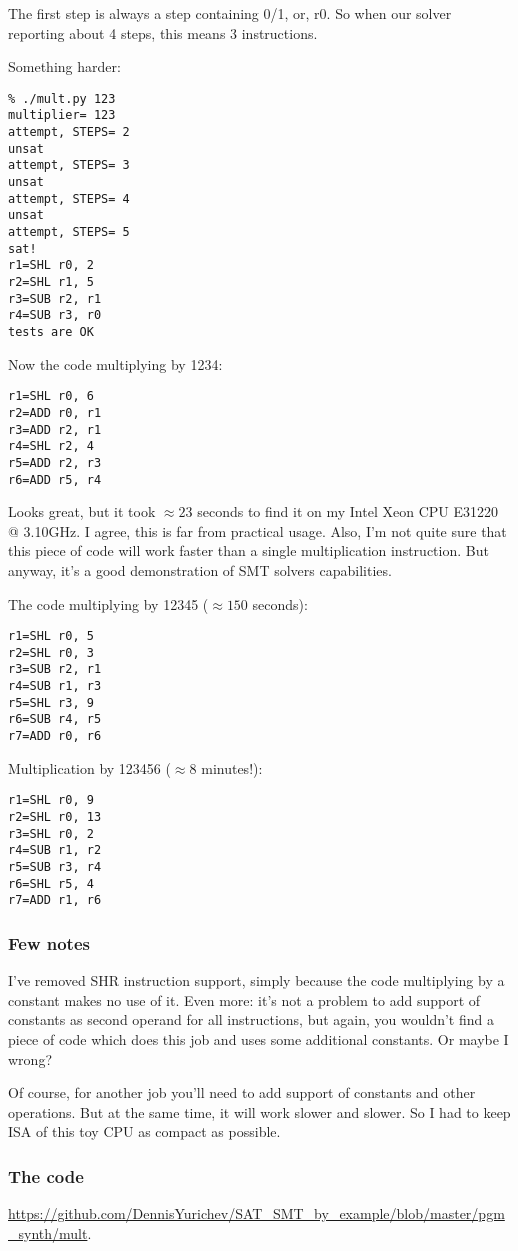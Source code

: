 The first step is always a step containing 0/1, or, r0.
So when our solver reporting about 4 steps, this means 3 instructions.

Something harder:

\begin{lstlisting}
% ./mult.py 123
multiplier= 123
attempt, STEPS= 2
unsat
attempt, STEPS= 3
unsat
attempt, STEPS= 4
unsat
attempt, STEPS= 5
sat!
r1=SHL r0, 2
r2=SHL r1, 5
r3=SUB r2, r1
r4=SUB r3, r0
tests are OK
\end{lstlisting}

Now the code multiplying by 1234:

\begin{lstlisting}
r1=SHL r0, 6
r2=ADD r0, r1
r3=ADD r2, r1
r4=SHL r2, 4
r5=ADD r2, r3
r6=ADD r5, r4
\end{lstlisting}

Looks great, but it took $\approx 23$ seconds to find it on my Intel Xeon CPU E31220 @ 3.10GHz.
I agree, this is far from practical usage.
Also, I'm not quite sure that this piece of code will work faster than a single multiplication instruction.
But anyway, it's a good demonstration of SMT solvers capabilities.

The code multiplying by 12345 ($\approx 150$ seconds):

\begin{lstlisting}
r1=SHL r0, 5
r2=SHL r0, 3
r3=SUB r2, r1
r4=SUB r1, r3
r5=SHL r3, 9
r6=SUB r4, r5
r7=ADD r0, r6
\end{lstlisting}

Multiplication by 123456 ($\approx 8$ minutes!):

\begin{lstlisting}
r1=SHL r0, 9
r2=SHL r0, 13
r3=SHL r0, 2
r4=SUB r1, r2
r5=SUB r3, r4
r6=SHL r5, 4
r7=ADD r1, r6
\end{lstlisting}

\subsubsection{Few notes}

I've removed SHR instruction support, simply because the code multiplying by a constant makes no use of it.
Even more: it's not a problem to add support of constants as second operand for all instructions,
but again, you wouldn't find a piece of code which does this job and uses some additional constants.
Or maybe I wrong?

Of course, for another job you'll need to add support of constants and other operations.
But at the same time, it will work slower and slower.
So I had to keep \ac{ISA} of this toy \ac{CPU} as compact as possible.

\subsubsection{The code}

\url{https://github.com/DennisYurichev/SAT_SMT_by_example/blob/master/pgm_synth/mult}.

